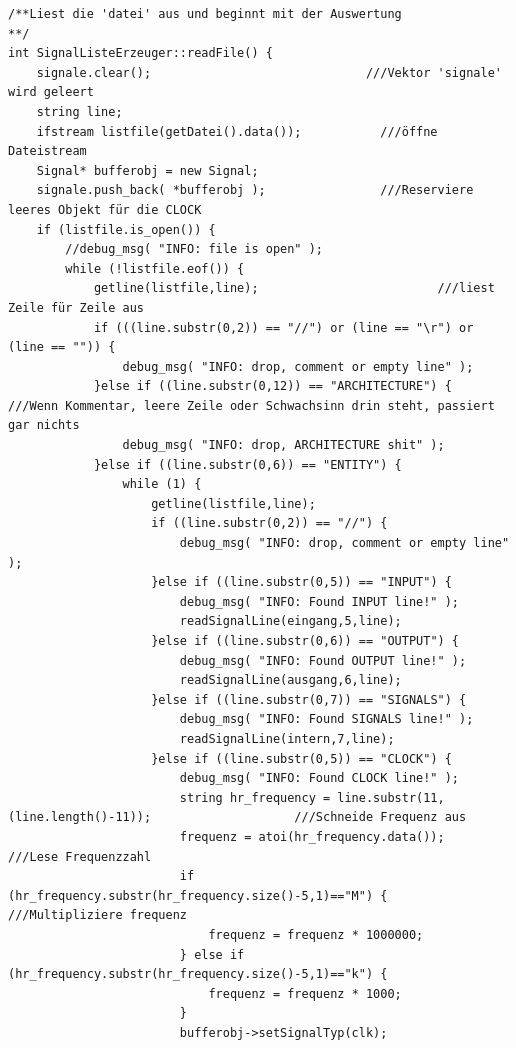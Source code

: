 \documentclass[a4paper,10pt,twoside]{report}
\begin{document}
\begin{lstlisting}
/**Liest die 'datei' aus und beginnt mit der Auswertung
**/
int SignalListeErzeuger::readFile() {
    signale.clear();                              ///Vektor 'signale' wird geleert
    string line;
    ifstream listfile(getDatei().data());           ///öffne Dateistream
    Signal* bufferobj = new Signal;
    signale.push_back( *bufferobj );                ///Reserviere leeres Objekt für die CLOCK
    if (listfile.is_open()) {
        //debug_msg( "INFO: file is open" );
        while (!listfile.eof()) {
            getline(listfile,line);                         ///liest Zeile für Zeile aus
            if (((line.substr(0,2)) == "//") or (line == "\r") or (line == "")) {
                debug_msg( "INFO: drop, comment or empty line" );
            }else if ((line.substr(0,12)) == "ARCHITECTURE") {                              ///Wenn Kommentar, leere Zeile oder Schwachsinn drin steht, passiert gar nichts
                debug_msg( "INFO: drop, ARCHITECTURE shit" );
            }else if ((line.substr(0,6)) == "ENTITY") {
                while (1) {
                    getline(listfile,line);
                    if ((line.substr(0,2)) == "//") {
                        debug_msg( "INFO: drop, comment or empty line" );
                    }else if ((line.substr(0,5)) == "INPUT") {
                        debug_msg( "INFO: Found INPUT line!" );
                        readSignalLine(eingang,5,line);
                    }else if ((line.substr(0,6)) == "OUTPUT") {
                        debug_msg( "INFO: Found OUTPUT line!" );
                        readSignalLine(ausgang,6,line);
                    }else if ((line.substr(0,7)) == "SIGNALS") {
                        debug_msg( "INFO: Found SIGNALS line!" );
                        readSignalLine(intern,7,line);
                    }else if ((line.substr(0,5)) == "CLOCK") {
                        debug_msg( "INFO: Found CLOCK line!" );
                        string hr_frequency = line.substr(11,(line.length()-11));                    ///Schneide Frequenz aus
                        frequenz = atoi(hr_frequency.data());                                        ///Lese Frequenzzahl
                        if (hr_frequency.substr(hr_frequency.size()-5,1)=="M") {                                                ///Multipliziere frequenz
                            frequenz = frequenz * 1000000;
                        } else if (hr_frequency.substr(hr_frequency.size()-5,1)=="k") {
                            frequenz = frequenz * 1000;
                        }
                        bufferobj->setSignalTyp(clk);

\end{lstlisting}
\end{document}
